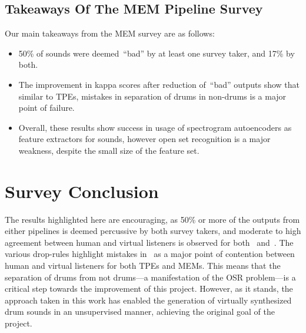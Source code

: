 \documentclass[\main/thesis.tex]{subfiles}
\begin{document}

\subsection{Takeaways Of The MEM Pipeline Survey}
\label{survey2_takeaway}
Our main takeaways from the MEM survey are as follows:
\begin{itemize}
\item 50\% of sounds were deemed~\enquote{bad} by at least one survey taker, and 17\% by both.
\item The improvement in kappa scores after reduction of~\enquote{bad} outputs show that similar to TPEs, mistakes in separation of drums in non-drums is a major point of failure. 
\item Overall, these results show success in usage of spectrogram autoencoders as feature extractors for sounds, however open set recognition is a major weakness, despite the small size of the feature set.
\end{itemize}

\section{Survey Conclusion}
The results highlighted here are encouraging, as 50\% or more of the outputs from either pipelines is deemed percussive by both survey takers, and moderate to high agreement between human and virtual listeners is observed for both \decfirst~and~\decsecond. The various drop-rules highlight mistakes in \decfirst~as a major point of contention between human and virtual listeners for both TPEs and MEMs. This means that the separation of drums from not drums---a manifestation of the OSR problem---is a critical step towards the improvement of this project. However, as it stands, the approach taken in this work has enabled the generation of virtually synthesized drum sounds in an unsupervised manner, achieving the original goal of the project. 
\end{document}
